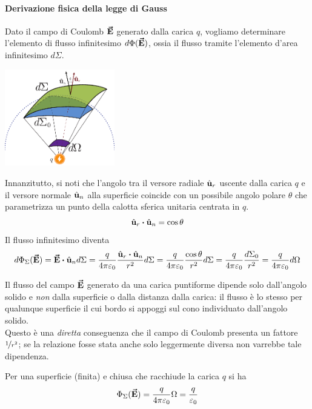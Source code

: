 \paragraph{Derivazione fisica della legge di Gauss}
Dato il campo di Coulomb $\vb*{\va{E}}$ generato dalla carica $q$, vogliamo determinare l'elemento di flusso infinitesimo $d\Phi(\vb*{\va{E}})$, ossia il flusso tramite l'elemento d'area infinitesimo $d\Sigma$.
\begin{center}
	\includegraphics[width=0.36\textwidth]{images/chp2flussodim1.pdf}
\end{center}
Innanzitutto, si noti che l'angolo tra il versore radiale $\hat{\mathbf{u}}_r$ uscente dalla carica $q$ e il versore normale $\hat{\mathbf{u}}_n$ alla superficie coincide con un possibile angolo polare $\theta$ che parametrizza un punto della calotta sferica unitaria centrata in $q$.
\begin{equation*}
\vbh{u}_r\vdot\vbh{u}_n=\cos\theta
\end{equation*}
Il flusso infinitesimo diventa
\begin{equation*}
	d\Phi_{\Sigma}(\vba{E})=\vba{E}\vdot\vbh{u}_nd\Sigma=\frac{q}{4\pi\epsilon_0}\frac{\vbh{u}_r\vdot\vbh{u}_n}{r^2}d\Sigma=\frac{q}{4\pi\epsilon_0}\frac{\cos\theta}{r^2}d\Sigma=\frac{q}{4\pi\epsilon_0}\frac{d\Sigma_0}{r^2}=\frac{q}{4\pi\epsilon_0}d\Omega
\end{equation*}
\begin{observe}
	Il flusso del campo $\vb*{\va{E}}$ generato da una carica puntiforme dipende solo dall'angolo solido e \textit{non} dalla superficie o dalla distanza dalla carica: il flusso è lo stesso per qualunque superficie il cui bordo si appoggi sul cono individuato dall'angolo solido.\\
	Questo è una \textit{diretta} conseguenza che il campo di Coulomb presenta un fattore $\nicefrac{1}{r^2}$; se la relazione fosse stata anche solo leggermente diversa non varrebbe tale dipendenza.
\end{observe}
Per una superficie (finita) e chiusa che racchiude la carica $q$ si ha
 \begin{equation*}
 	\Phi_\Sigma(\vb*{\va{E}})=\frac{q}{4\pi\varepsilon_0}\Omega=\frac{q}{\varepsilon_0}
 \end{equation*}
